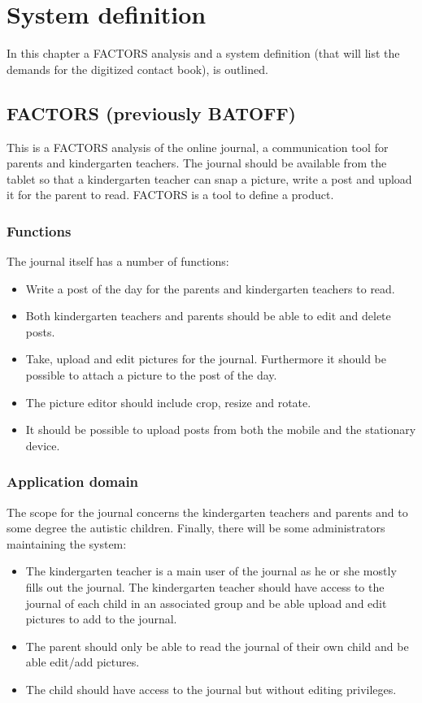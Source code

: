 \chapter{System definition}
In this chapter a FACTORS analysis and a system definition (that will list the demands for the digitized contact book), is outlined.

\section{FACTORS (previously BATOFF)}
This is a FACTORS analysis of the online journal, a communication tool for parents and kindergarten teachers. The journal should be available from the tablet so that a kindergarten teacher can snap a picture, write a post and upload it for the parent to read. FACTORS is a tool to define a product.

\subsection{Functions}
The journal itself has a number of functions:
\begin{itemize}
	\item{Write a post of the day for the parents and kindergarten teachers to read.}
	\item{Both kindergarten teachers and parents should be able to edit and delete posts.}
	\item{Take, upload and edit pictures for the journal. Furthermore it should be possible to attach a picture to the post of the day.}
	\item{The picture editor should include crop, resize and rotate.}
	\item{It should be possible to upload posts from both the mobile and the stationary device.}
\end{itemize}

\subsection{Application domain}
The scope for the journal concerns the kindergarten teachers and parents and to some degree the autistic children. Finally, there will be some administrators maintaining the system:
\begin{itemize}
	\item{The kindergarten teacher is a main user of the journal as he or she mostly fills out the journal. The kindergarten teacher should have access to the journal of each child in an associated group and be able upload and edit pictures to add to the journal.}
	\item{The parent should only be able to read the journal of their own child and be able edit/add pictures.}
	\item{The child should have access to the journal but without editing privileges.}
\end{itemize}

